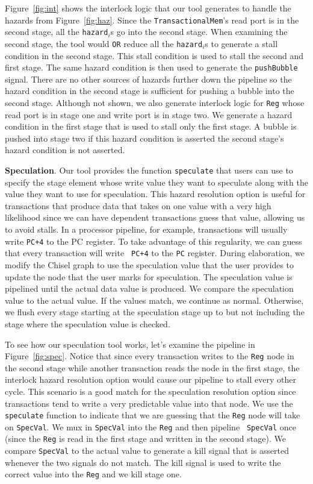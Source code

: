Figure~\ref{fig:int} shows the interlock logic that our tool
generates to handle the hazards from Figure~\ref{fig:haz}. Since
the {\tt TransactionalMem}'s read port is in the second stage, all the
{\tt hazard$_i$}s go into the second stage. When examining the second
stage, the tool would {\tt OR} reduce all the {\tt hazard}$_i$s to
generate a stall condition in the second stage. This stall condition
is used to stall the second and first stage. The same hazard
condition is then used to generate the {\tt pushBubble} signal. There
are no other sources of hazards further down the pipeline so the
hazard condition in the second stage is sufficient for pushing a
bubble into the second stage. Although not shown, we also generate
interlock logic for {\tt Reg} whose read port is in stage one and
write port is in stage two. We generate a hazard condition in the
first stage that is used to stall only the first stage. A bubble is
pushed into stage two if this hazard condition is asserted the second
stage's hazard condition is not asserted.

{\bf Speculation}. Our tool provides the function {\tt speculate} that
users can use to specify the stage element whose write value they want
to speculate along with the value they want to use for
speculation. This hazard resolution option is useful for transactions
that produce data that takes on one value with a very high likelihood
since we can have dependent transactions guess that value, allowing us
to avoid stalls. In a processor pipeline, for example, transactions
will usually write {\tt PC+4} to the PC register. To take advantage of
this regularity, we can guess that every transaction will write {\tt
  PC+4} to the {\tt PC} register. During elaboration, we modify the
Chisel graph to use the speculation value that the user provides to
update the node that the user marks for speculation. The speculation
value is pipelined until the actual data value is produced. We compare
the speculation value to the actual value. If the values match, we
continue as normal. Otherwise, we flush every stage starting at the
speculation stage up to but not including the stage where the
speculation value is checked.

To see how our speculation tool works, let's examine the pipeline in
Figure~\ref{fig:spec}. Notice that since every
transaction writes to the {\tt Reg} node in the second stage while
another transaction reads the node in the first stage, the interlock
hazard resolution option would cause our pipeline to stall every other
cycle. This scenario is a good match for the speculation resolution
option since transactions tend to write a very predictable value into
that node. We use the {\tt speculate} function to indicate that we
are guessing that the {\tt Reg} node will take on {\tt SpecVal}. We
mux in {\tt SpecVal} into the {\tt Reg} and then pipeline {\tt
  SpecVal} once (since the {\tt Reg} is read in the first stage and
written in the second stage). We compare {\tt SpecVal} to the actual
value to generate a kill signal that is asserted whenever the two
signals do not match. The kill signal is used to write the correct
value into the {\tt Reg} and we kill stage one.

